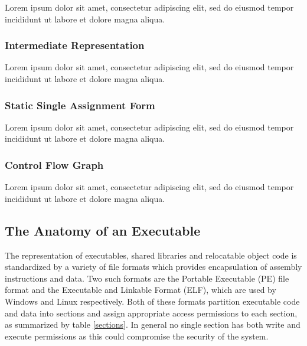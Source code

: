 \documentclass[12pt, a4paper]{article}
\begin{document}
Lorem ipsum dolor sit amet, consectetur adipiscing elit, sed do eiusmod tempor incididunt ut labore et dolore magna aliqua.


\subsubsection{Intermediate Representation}

Lorem ipsum dolor sit amet, consectetur adipiscing elit, sed do eiusmod tempor incididunt ut labore et dolore magna aliqua.


\subsubsection{Static Single Assignment Form}

Lorem ipsum dolor sit amet, consectetur adipiscing elit, sed do eiusmod tempor incididunt ut labore et dolore magna aliqua.

\cite{ssa_decomp}


\subsubsection{Control Flow Graph}

Lorem ipsum dolor sit amet, consectetur adipiscing elit, sed do eiusmod tempor incididunt ut labore et dolore magna aliqua.


\subsection{The Anatomy of an Executable}

The representation of executables, shared libraries and relocatable object code is standardized by a variety of file formats which provides encapsulation of assembly instructions and data. Two such formats are the Portable Executable (PE) file format and the Executable and Linkable Format (ELF), which are used by Windows and Linux respectively. Both of these formats partition executable code and data into sections and assign appropriate access permissions to each section, as summarized by table \ref{sections}. In general no single section has both write and execute permissions as this could compromise the security of the system.
\end{document}
